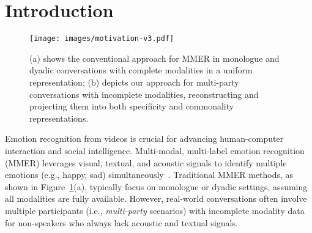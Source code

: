 \section{Introduction}

\begin{figure}[t] %
    \centering %
    \texttt{[image: images/motivation-v3.pdf]}
    \vspace{-1.5em}
    \caption{(a) shows the conventional approach for MMER in monologue and dyadic conversations with complete modalities in a uniform representation; (b) depicts our approach for multi-party conversations with incomplete modalities, reconstructing and projecting them into both specificity and commonality representations.}
    \vspace{-1em}
    \label{fig: motivation}
\end{figure}

Emotion recognition from videos is crucial for advancing human-computer interaction and social intelligence. Multi-modal, multi-label emotion recognition (MMER) leverages visual, textual, and acoustic signals to identify multiple emotions (e.g., happy, sad) simultaneously~\cite{MMER1,MMER2}.
Traditional MMER methods, as shown in Figure~\ref{fig: motivation}(a), typically focus on monologue or dyadic settings, assuming all modalities are fully available. However, real-world conversations often involve multiple participants (i.e., \textit{multi-party} scenarios) with incomplete modality data for non-speakers who always lack acoustic and textual signals.

